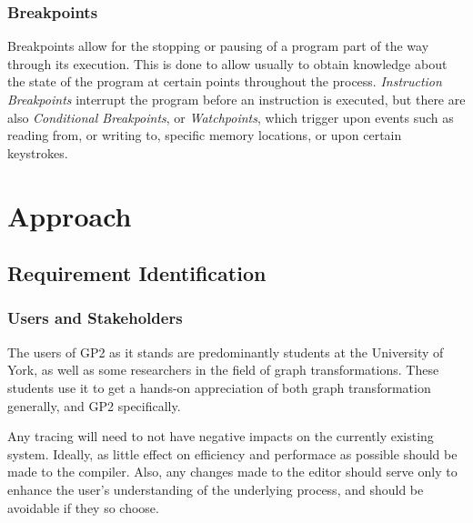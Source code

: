 \documentclass{UoYCSproject}
\begin{document}
\subsection{Breakpoints}
Breakpoints allow for the stopping or pausing of a program part of the way through its execution. This is done to allow usually to obtain knowledge about the state of the program at certain points throughout the process. \emph{Instruction Breakpoints} interrupt the program before an instruction is executed, but there are also \emph{Conditional Breakpoints}, or \emph{Watchpoints}, which trigger upon events such as reading from, or writing to, specific memory locations, or upon certain keystrokes.




\chapter{Approach}
\section{Requirement Identification}

\subsection{Users and Stakeholders}
The users of GP2 as it stands are predominantly students at the University of York, as well as some researchers in the field of graph transformations. These students use it to get a hands-on appreciation of both graph transformation generally, and GP2 specifically.

Any tracing will need to not have negative impacts on the currently existing system. Ideally, as little effect on efficiency and performace as possible should be made to the compiler. Also, any changes made to the editor should serve only to enhance the user's understanding of the underlying process, and should be avoidable if they so choose.
\end{document}
